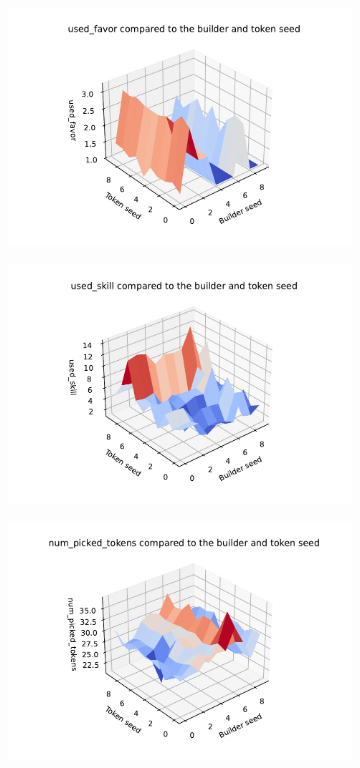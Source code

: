\begin{figure}[H]
   \begin{subfigure}[b]{0.3\textwidth}
        \includegraphics[width=\textwidth]{img/favor.pdf}
    \end{subfigure}
    \begin{subfigure}[b]{0.3\textwidth}
        \includegraphics[width=\textwidth]{img/skills.pdf}
    \end{subfigure}
    \begin{subfigure}[b]{0.3\textwidth}
        \includegraphics[width=\textwidth]{img/tokens.pdf}

\end{subfigure}
\end{figure}
